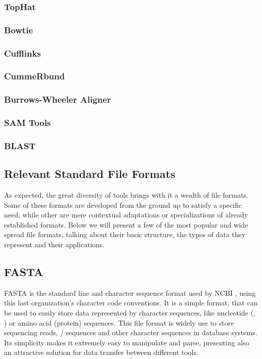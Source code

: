 \subsubsection*{TopHat}

\subsubsection*{Bowtie}

\subsubsection*{Cufflinks}

\subsubsection*{CummeRbund}

\subsubsection{Burrows-Wheeler Aligner}

\subsubsection{SAM Tools}

\subsubsection{BLAST}

\subsection{Relevant Standard File Formats}\label{sec:formats}

As expected, the great diversity of \rnaseq{} tools brings with it a wealth of
file formats. Some of these formats are developed from the ground up to satisfy
a specific need, while other are mere contextual adaptations or specializations
of already established formats. Below we will present a few of the most popular
and wide spread file formats, talking about their basic structure, the types of
data they represent and their applications.

\subsection{FASTA}

FASTA is the standard line and character sequence format used by NCBI
\cite{ncbi:fasta}, using this last organization's character code conventions. It
is a simple format, that can be used to easily store data represented by
character sequences, like nucleotide (\dna, \rna) or amino acid (protein)
sequences. This file format is widely use to store sequencing reads, \dna/\rna{}
sequences and other character sequences in database systems. Its simplicity
makes it extremely easy to manipulate and parse, presenting also an attractive
solution for data transfer between different tools.


